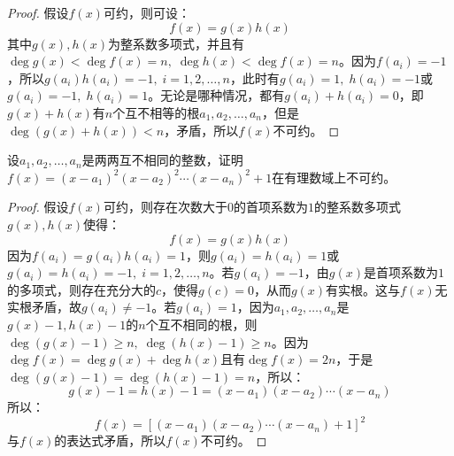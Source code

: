 \begin{proof}
	假设$f(x)$可约，则可设：
	\begin{equation*}
		f(x)=g(x)h(x)
	\end{equation*}
	其中$g(x),h(x)$为整系数多项式，并且有$\deg g(x)<\deg f(x)=n,\;\deg h(x)<\deg f(x)=n$。因为$f(a_i)=-1$，所以$g(a_i)h(a_i)=-1,\;i=1,2,\dots,n$，此时有$g(a_i)=1,\;h(a_i)=-1$或$g(a_i)=-1,\;h(a_i)=1$。无论是哪种情况，都有$g(a_i)+h(a_i)=0$，即$g(x)+h(x)$有$n$个互不相等的根$a_1,a_2,\dots,a_n$，但是$\deg(g(x)+h(x))<n$，矛盾，所以$f(x)$不可约。
\end{proof}
\begin{theorem}
	设$a_1,a_2,\dots,a_n$是两两互不相同的整数，证明$f(x)=(x-a_1)^2(x-a_2)^2\cdots(x-a_n)^2+1$在有理数域上不可约。
\end{theorem}
\begin{proof}
	假设$f(x)$可约，则存在次数大于$0$的首项系数为$1$的整系数多项式$g(x),h(x)$使得：
	\begin{equation*}
		f(x)=g(x)h(x)
	\end{equation*}
	因为$f(a_i)=g(a_i)h(a_i)=1$，则$g(a_i)=h(a_i)=1$或$g(a_i)=h(a_i)=-1,\;i=1,2,\dots,n$。若$g(a_i)=-1$，由$g(x)$是首项系数为$1$的多项式，则存在充分大的$c$，使得$g(c)=0$，从而$g(x)$有实根。这与$f(x)$无实根矛盾，故$g(a_i)\ne-1$。若$g(a_i)=1$，因为$a_1,a_2,\dots,a_n$是$g(x)-1,h(x)-1$的$n$个互不相同的根，则$\deg(g(x)-1)\geqslant n,\;\deg(h(x)-1)\geqslant n$。因为$\deg f(x)=\deg g(x)+\deg h(x)$且有$\deg f(x)=2n$，于是$\deg(g(x)-1)=\deg(h(x)-1)=n$，所以：
	\begin{equation*}
		g(x)-1=h(x)-1=(x-a_1)(x-a_2)\cdots(x-a_n)
	\end{equation*}
	所以：
	\begin{equation*}
		f(x)=[(x-a_1)(x-a_2)\cdots(x-a_n)+1]^2
	\end{equation*}
	与$f(x)$的表达式矛盾，所以$f(x)$不可约。
\end{proof}

